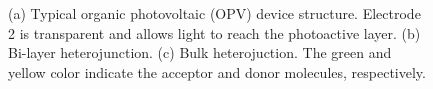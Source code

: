 \documentclass[12pt]{article}
\begin{document}
\begin{figure}[H]
\centering
{}
\caption{(a) Typical organic photovoltaic (OPV) device structure. Electrode 2 is transparent and allows light to reach the photoactive layer. (b) Bi-layer heterojunction. (c) Bulk heterojuction. The green and yellow color indicate the acceptor and donor molecules, respectively.}\label{fig:OPV devices}
\end{figure}
\end{document}
